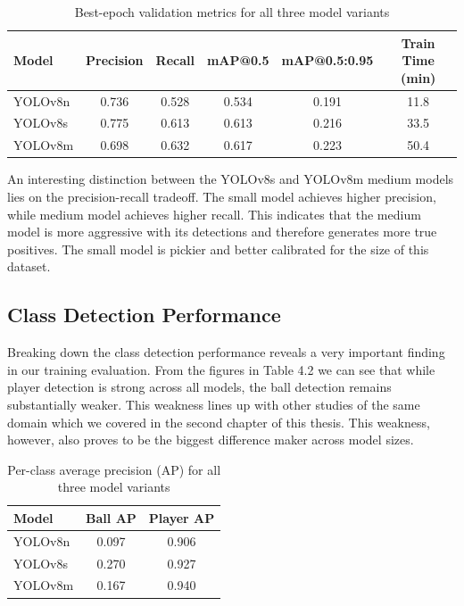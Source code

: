 \begin{table}[H]
\centering
\label{tab:training_results}
\begin{tabular}{lccccc}
\hline
\textbf{Model} & \textbf{Precision} & \textbf{Recall} & \textbf{mAP@0.5} & \textbf{mAP@0.5:0.95} & \textbf{Train Time (min)} \\
\hline
YOLOv8n & 0.736 & 0.528 & 0.534 & 0.191 & 11.8 \\
YOLOv8s & 0.775 & 0.613 & 0.613 & 0.216 & 33.5 \\
YOLOv8m & 0.698 & 0.632 & 0.617 & 0.223 & 50.4 \\
\hline
\end{tabular}
\caption{Best-epoch validation metrics for all three model variants}
\end{table}

An interesting distinction between the  YOLOv8s and  YOLOv8m medium models lies on the precision-recall tradeoff. The small model achieves higher precision, while medium model achieves higher recall. This indicates that the medium model is more aggressive with its detections and therefore generates more true positives. The small model is pickier and better calibrated for the size of this dataset. 

\subsection{Class Detection Performance}
Breaking down the class detection performance reveals a very important finding in our training evaluation. From the figures in Table 4.2 we can see that while player detection is strong across all models, the ball detection remains substantially weaker. This weakness lines up with other studies of the same domain which we covered in the second chapter of this thesis. This weakness, however,  also proves to be the biggest difference maker across model sizes. 

\begin{table}[H]
\centering
\label{tab:perclass_ap}
\begin{tabular}{lcc}
\toprule
\textbf{Model} & \textbf{Ball AP} & \textbf{Player AP} \\
\midrule
YOLOv8n & 0.097 & 0.906 \\
YOLOv8s & 0.270 & 0.927 \\
YOLOv8m & 0.167 & 0.940 \\
\bottomrule
\end{tabular}
\caption{Per-class average precision (AP) for all three model variants}
\end{table}


